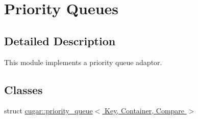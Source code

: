 \hypertarget{group___priority_queues}{}\section{Priority Queues}
\label{group___priority_queues}


\subsection{Detailed Description}
This module implements a priority queue adaptor. \subsection*{Classes}
\begin{DoxyCompactItemize}
\item 
struct \hyperlink{structcugar_1_1priority__queue}{cugar\+::priority\+\_\+queue$<$ Key, Container, Compare $>$}
\end{DoxyCompactItemize}

